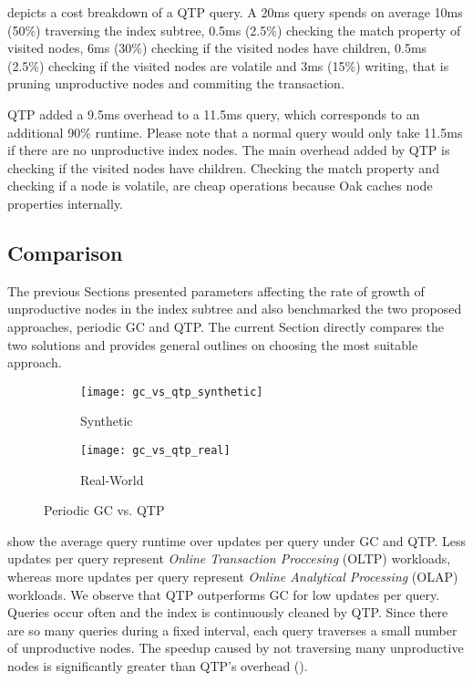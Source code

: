 \documentclass[abstracton,12pt]{scrartcl}
\theoremstyle{definition}
\begin{document}
 depicts a cost breakdown of a QTP query. A 20ms query
spends on average 10ms (50\%) traversing the index subtree, 0.5ms (2.5\%) checking
the match property of visited nodes, 6ms (30\%) checking if the visited nodes
have children, 0.5ms (2.5\%) checking if the visited nodes are volatile and 3ms
(15\%) writing, that is pruning unproductive nodes and commiting the transaction.

QTP added a 9.5ms overhead to a 11.5ms query, which corresponds to an additional 90\%
runtime. Please note that a normal query would only take 11.5ms if there are no
unproductive index nodes. The main overhead added by QTP is checking if the visited 
nodes have children. Checking the match property and checking if a node is volatile, 
are cheap operations because Oak caches node properties internally.

\subsection{Comparison}

\label{sec:comparison}

The previous Sections presented parameters affecting the rate of growth of
unproductive nodes in the index subtree and also benchmarked the two proposed
approaches, periodic GC and QTP. The current Section directly compares the
two solutions and provides general outlines on choosing the most suitable
approach.

\begin{figure}[h]
  \centering
  \begin{subfigure}{0.49\linewidth}
    \centering
    \caption{Synthetic}
    \texttt{[image: gc\_vs\_qtp\_synthetic]}
    \label{fig:gc_vs_qtp_synthetic}
  \end{subfigure}
  \begin{subfigure}{0.49\linewidth}
    \centering
    \caption{Real-World}
    \texttt{[image: gc\_vs\_qtp\_real]}
    \label{fig:gc_vs_qtp_real}
  \end{subfigure}
  \vspace{-0.5cm}
  \caption{Periodic GC vs. QTP}
\end{figure}

 show the average query
runtime over updates per query under GC and QTP. Less updates per query
represent \textit{Online Transaction Proccesing} (OLTP) workloads, 
whereas more updates per query represent
\textit{Online Analytical Processing} (OLAP) \cite{Hainaut2009-olap} workloads. 
We observe that QTP outperforms GC for low
updates per query. Queries occur often and the index is continuously cleaned by QTP.
Since there are so many queries during a fixed interval, each query traverses
a small number of unproductive nodes. The speedup caused by not traversing 
many unproductive nodes is significantly greater than QTP's overhead 
().
\end{document}
